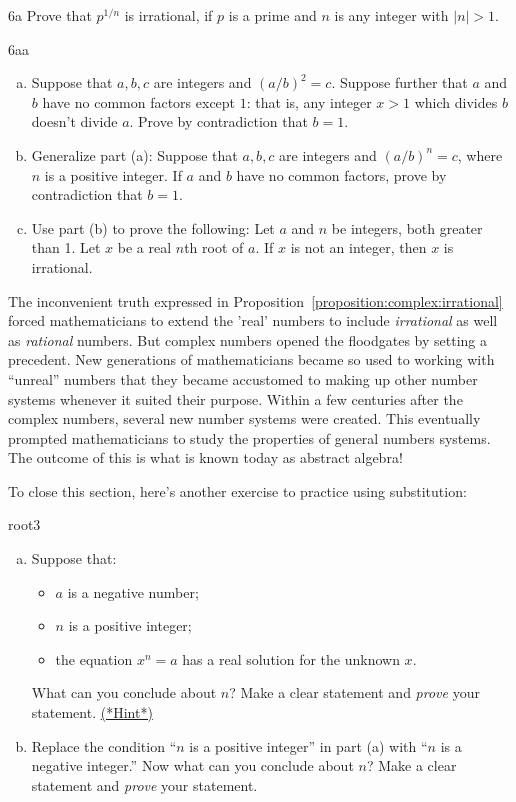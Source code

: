 \begin{exercise}{6a}
Prove that $p^{1/n}$ is irrational, if $p$ is a prime and $n$ is any integer with $|n|>1$.
\end{exercise}

\begin{exercise}{6aa}
\begin{enumerate}[(a)]
\item
Suppose that $a,b,c$ are integers and  $(a/b)^2 = c$.  Suppose further that $a$ and $b$ have no common factors except $1$: that is, any integer $x > 1$ which divides $b$ doesn't divide $a$.  Prove by contradiction that $b=1$.
\item
Generalize part (a): Suppose that $a,b,c$ are integers and  $(a/b)^n = c$, where $n$ is a positive integer. If $a$ and $b$ have no common factors, prove by contradiction that $b=1$.
\item
Use part (b) to prove the following: Let $a$ and $n$ be integers, both greater than 1. Let $x$ be a real $n$th root of $a$.  If $x$ is not an integer, then $x$ is irrational.
\end{enumerate}
\end{exercise}


The inconvenient truth expressed in Proposition~\ref{proposition:complex:irrational} forced mathematicians to extend
the 'real' numbers to include \emph{irrational} as well as \emph{rational}
numbers. But complex numbers opened the floodgates by setting a precedent. New generations of mathematicians 
became so used to working with ``unreal'' numbers that they became accustomed to making up other number systems whenever it suited their purpose.
Within a few centuries after the complex numbers, several new
number systems were created. This eventually prompted  mathematicians to study the properties of general numbers
systems. The outcome of this is what is known today as  abstract
algebra!

To close this section, here's another exercise to practice using substitution:

\begin{exercise}{root3}
\begin{enumerate}[(a)]
\item
Suppose that:
\begin{itemize}
\item
$a$ is a negative number;
\item
$n$ is a positive integer;
\item
the equation $x^n = a$ has a real solution for the unknown $x$.
\end{itemize}
What can you conclude about $n$? Make a clear statement and \emph{prove} your statement.
\hyperref[sec:complex:hints]{(*Hint*)}

\item
Replace the condition ``$n$ is a positive integer'' in part (a) with ``$n$ is a negative integer.'' Now what can you conclude about $n$? Make a clear statement and \emph{prove} your statement.
\end{enumerate}
\end{exercise}


